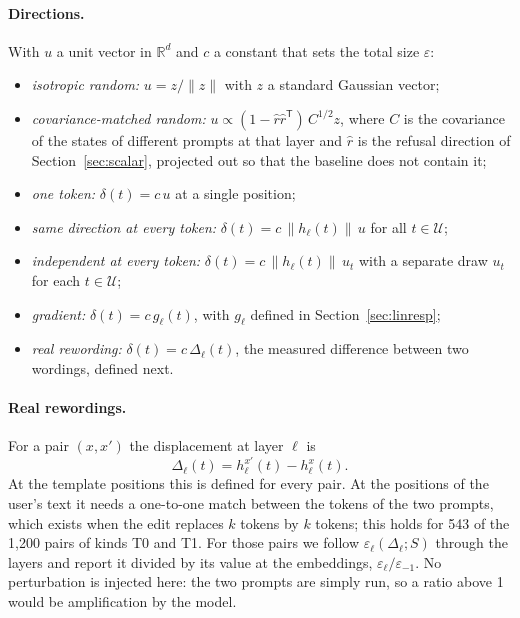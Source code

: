 \documentclass[11pt]{article}
\newcommand{\cU}{\mathcal{U}}
\begin{document}
\paragraph{Directions.} With $u$ a unit vector in $\mathbb{R}^d$ and $c$ a constant that sets the total size $\varepsilon$:
\begin{itemize}
\item \emph{isotropic random:} $u=z/\lVert z\rVert$ with $z$ a standard Gaussian vector;
\item \emph{covariance-matched random:} $u\propto(1-\hat r\hat r^{\mathsf T})\,C^{1/2}z$, where $C$ is the covariance of the states of different prompts at that layer and $\hat r$ is the refusal direction of Section~\ref{sec:scalar}, projected out so that the baseline does not contain it;
\item \emph{one token:} $\delta(t)=c\,u$ at a single position;
\item \emph{same direction at every token:} $\delta(t)=c\,\lVert h_\ell(t)\rVert\,u$ for all $t\in\cU$;
\item \emph{independent at every token:} $\delta(t)=c\,\lVert h_\ell(t)\rVert\,u_t$ with a separate draw $u_t$ for each $t\in\cU$;
\item \emph{gradient:} $\delta(t)=c\,g_\ell(t)$, with $g_\ell$ defined in Section~\ref{sec:linresp};
\item \emph{real rewording:} $\delta(t)=c\,\Delta_\ell(t)$, the measured difference between two wordings, defined next.
\end{itemize}

\paragraph{Real rewordings.} For a pair $(x,x')$ the displacement at layer $\ell$ is
\begin{equation}
\Delta_\ell(t)=h^{x'}_\ell(t)-h^{x}_\ell(t) .
\label{eq:Delta}
\end{equation}
At the template positions this is defined for every pair. At the positions of the user's text it needs a one-to-one match between the tokens of the two prompts, which exists when the edit replaces $k$ tokens by $k$ tokens; this holds for 543 of the 1{,}200 pairs of kinds T0 and T1. For those pairs we follow $\varepsilon_\ell(\Delta_\ell;S)$ through the layers and report it divided by its value at the embeddings, $\varepsilon_\ell/\varepsilon_{-1}$. No perturbation is injected here: the two prompts are simply run, so a ratio above 1 would be amplification by the model.
\end{document}

